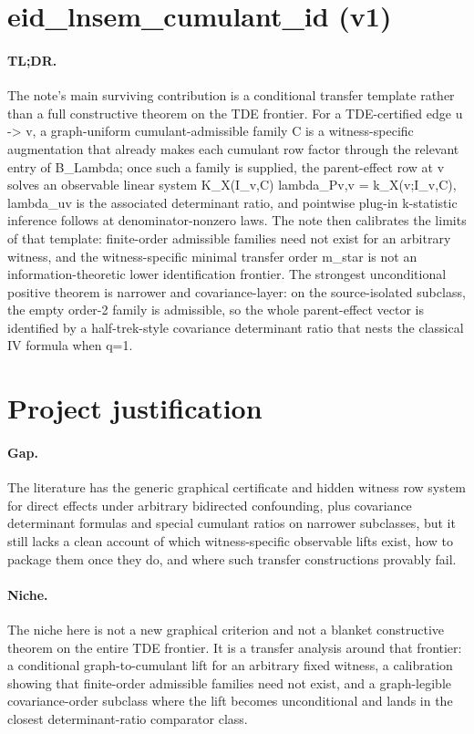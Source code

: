 \documentclass{article}
\begin{document}
\section*{eid_lnsem_cumulant_id (v1)}

\paragraph{TL;DR.} The note's main surviving contribution is a conditional transfer template rather than a full constructive theorem on the TDE frontier. For a TDE-certified edge u -> v, a graph-uniform cumulant-admissible family C is a witness-specific augmentation that already makes each cumulant row factor through the relevant entry of B_Lambda; once such a family is supplied, the parent-effect row at v solves an observable linear system K_X(I_v,C) lambda_Pv,v = k_X(v;I_v,C), lambda_uv is the associated determinant ratio, and pointwise plug-in k-statistic inference follows at denominator-nonzero laws. The note then calibrates the limits of that template: finite-order admissible families need not exist for an arbitrary witness, and the witness-specific minimal transfer order m_star is not an information-theoretic lower identification frontier. The strongest unconditional positive theorem is narrower and covariance-layer: on the source-isolated subclass, the empty order-2 family is admissible, so the whole parent-effect vector is identified by a half-trek-style covariance determinant ratio that nests the classical IV formula when q=1.

\section{Project justification}

\paragraph{Gap.} The literature has the generic graphical certificate and hidden witness row system for direct effects under arbitrary bidirected confounding, plus covariance determinant formulas and special cumulant ratios on narrower subclasses, but it still lacks a clean account of which witness-specific observable lifts exist, how to package them once they do, and where such transfer constructions provably fail.

\paragraph{Niche.} The niche here is not a new graphical criterion and not a blanket constructive theorem on the entire TDE frontier. It is a transfer analysis around that frontier: a conditional graph-to-cumulant lift for an arbitrary fixed witness, a calibration showing that finite-order admissible families need not exist, and a graph-legible covariance-order subclass where the lift becomes unconditional and lands in the closest determinant-ratio comparator class.
\end{document}
